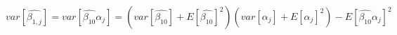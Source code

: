 \begin{equation}
var[\hat{\beta_{1,j}}] = var[\hat{\beta_{10}}\alpha_j] = (var[\hat{\beta_{10}}] + E[\hat{\beta_{10}}]^2)(var[\alpha_j] + E[\alpha_j]^2) - E[\hat{\beta_{10}}\alpha_j]^2
\end{equation}